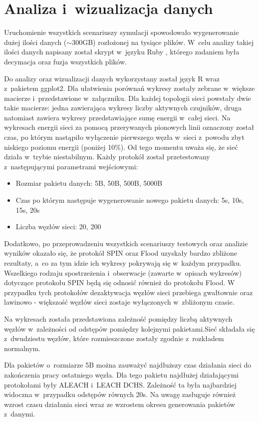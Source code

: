 \section{Analiza i~wizualizacja danych} \label{sec:analysis}
Uruchomienie wszystkich scenariuszy symulacji spowodowało wygenerowanie dużej ilości danych ($\sim$300GB) rozłożonej na tysiące plików. W~celu analizy takiej ilości danych napisany został skrypt w~języku Ruby \cite{ruby}, którego zadaniem była decymacja oraz fuzja wszystkich plików.

Do analizy oraz wizualizacji danych wykorzystany został język R wraz z~pakietem ggplot2. Dla ułatwienia porównań wykresy zostały zebrane w~większe macierze i~przedstawione w~załączniku. Dla każdej topologii sieci powstały dwie takie macierze: jedna zawierająca wykresy liczby aktywnych czujników, druga natomiast zawiera wykresy przedstawiające sumę energii w~całej sieci. Na wykresach energii sieci za pomocą przerywanych pionowych linii oznaczony został czas, po którym nastąpiło wyłączenie pierwszego węzła w~sieci z~powodu zbyt niskiego poziomu energii (poniżej 10\%). Od tego momentu uważa się, że sieć działa w~trybie niestabilnym.
Każdy protokół został przetestowany z~następującymi parametrami wejściowymi:
\begin{itemize}
	\item Rozmiar pakietu danych: 5B, 50B, 500B, 5000B
	\item Czas po którym następuje wygenerowanie nowego pakietu danych: 5s, 10s, 15s, 20s
	\item Liczba węzłów sieci: 20, 200
\end{itemize}

Dodatkowo, po przeprowadzeniu wszystkich scenariuszy testowych oraz analizie wyników okazało się, że protokół SPIN oraz Flood uzyskały bardzo zbliżone rezultaty, a~co za tym idzie ich wykresy pokrywają się w~każdym przypadku. Wszelkiego rodzaju spostrzeżenia i~obserwacje (zawarte w~opisach wykresów) dotyczące protokołu SPIN będą się odnosić również do protokołu Flood. 
W przypadku tych protokołów dezaktywacja węzłów sieci przebiega gwałtownie oraz lawinowo - większość węzłów sieci zostaje wyłączonych w~zbliżonym czasie.

\newpage
Na wykresach została przedstawiona zależność pomiędzy liczbą aktywnych węzłów w~zależności od odstępów pomiędzy kolejnymi pakietami.Sieć składała się z~dwudziestu węzłów, które rozmieszczone zostały zgodnie z~rozkładem normalnym.

Dla pakietów o~rozmiarze 5B można zauważyć najdłuższy czas działania sieci do zakończenia pracy ostatniego węzła. Dla tego pakietu najdłużej działającymi protokołami były ALEACH i~LEACH DCHS. Zależność ta była najbardziej widoczna w~przypadku odstępów równych 20s. Na uwagę zasługuje również wzrost czasu działania sieci wraz ze wzrostem okresu generowania pakietów z~danymi.

